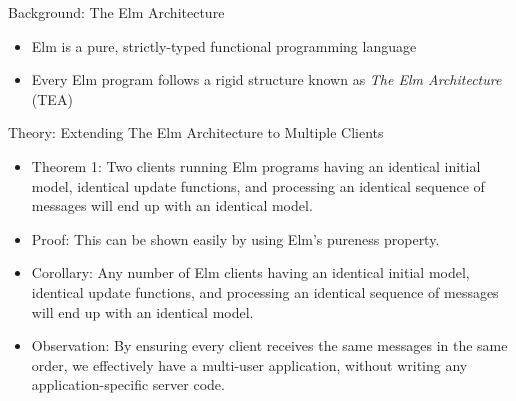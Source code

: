 \documentclass[22pt]{beamer}
\begin{document}
\begin{frame}[fragile]
\begin{textblock}{7.25}
        \begin{block}{\fontsize{37}{20}\selectfont Background: The Elm Architecture}
            \begin{itemize}
                \item Elm is a pure, strictly-typed functional programming language
                \item Every Elm program follows a rigid structure known as \textit{The Elm Architecture} (TEA)
            \end{itemize}
            \vspace{-6mm}
        \end{block}

        \begin{block}{\fontsize{37}{20}\selectfont Theory: Extending The Elm Architecture to Multiple Clients}
            \begin{itemize}
                \item Theorem 1: Two clients running Elm programs having an identical initial model,
                      identical update functions, and processing an identical sequence of messages will end up
                      with an identical model.
                \item Proof: This can be shown easily by using Elm's pureness property.
                \item Corollary: Any number of Elm clients having an identical initial model,
                      identical update functions, and processing an identical sequence of messages will end up
                      with an identical model.
                \item Observation: By ensuring every client receives the same messages in the same order,
                      we effectively have a multi-user application, without writing any application-specific server
                      code.
            \end{itemize}
        \end{block}


\end{textblock}
\end{frame}
\end{document}
